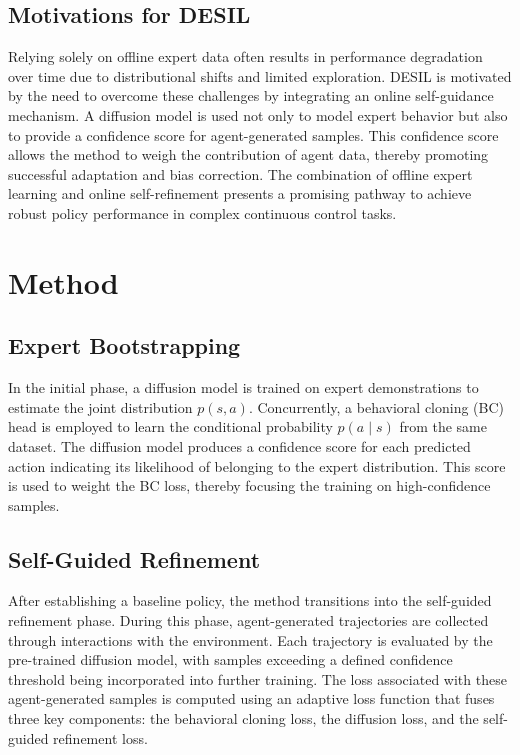 \documentclass{article} %
\begin{document}
\subsection{Motivations for DESIL}
Relying solely on offline expert data often results in performance degradation over time due to distributional shifts and limited exploration. DESIL is motivated by the need to overcome these challenges by integrating an online self-guidance mechanism. A diffusion model is used not only to model expert behavior but also to provide a confidence score for agent-generated samples. This confidence score allows the method to weigh the contribution of agent data, thereby promoting successful adaptation and bias correction. The combination of offline expert learning and online self-refinement presents a promising pathway to achieve robust policy performance in complex continuous control tasks.

\section{Method}
\label{sec:method}
\subsection{Expert Bootstrapping}
In the initial phase, a diffusion model is trained on expert demonstrations to estimate the joint distribution $p(s,a)$. Concurrently, a behavioral cloning (BC) head is employed to learn the conditional probability $p(a\mid s)$ from the same dataset. The diffusion model produces a confidence score for each predicted action indicating its likelihood of belonging to the expert distribution. This score is used to weight the BC loss, thereby focusing the training on high-confidence samples.

\subsection{Self-Guided Refinement}
After establishing a baseline policy, the method transitions into the self-guided refinement phase. During this phase, agent-generated trajectories are collected through interactions with the environment. Each trajectory is evaluated by the pre-trained diffusion model, with samples exceeding a defined confidence threshold being incorporated into further training. The loss associated with these agent-generated samples is computed using an adaptive loss function that fuses three key components: the behavioral cloning loss, the diffusion loss, and the self-guided refinement loss.
\end{document}
